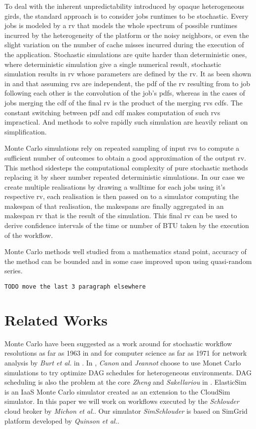 \documentclass[10pt,conference,compsocconf]{IEEEtran}
\begin{document}
To deal with the inherent unpredictability introduced by opaque heterogeneous
girds, the standard approach is to consider jobs runtimes to be stochastic.
Every jobs is modeled by a \ac{rv} that models the whole spectrum of possible
runtimes incurred by the heterogeneity of the platform or the noisy neighbors,
or even the slight variation on the number of cache misses incurred during the
execution of the application. Stochastic simulations are quite harder than
deterministic ones, where deterministic simulation give a single numerical
result, stochastic simulation results in \ac{rv} whose parameters are defined by
the \ac{rv}. It as been shown in \cite{Li97} and \cite{Ludwig01} that assuming
\acp{rv} are independent, the \ac{pdf} of the \ac{rv} resulting from to job
following each other is the convolution of the job's \acp{pdf}, whereas in the
cases of jobs merging the \ac{cdf} of the final \ac{rv} is the product of the
merging \acp{rv} \acp{cdf}.  The constant switching between \ac{pdf} and
\ac{cdf} makes computation of such \acp{rv} impractical. And methods to solve
rapidly such simulation are heavily reliant on simplification.

Monte Carlo simulations rely on repeated sampling of input \acp{rv} to compute a
sufficient number of outcomes to obtain a good approximation of the output
\ac{rv}. This method sidesteps the computational complexity of pure stochastic
methods replacing it by sheer number repeated deterministic simulations. In our
case we create multiple realisations by drawing a walltime for each jobs using
it's respective \ac{rv}, each realisation is then passed on to a simulator
computing the makespan of that realisation, the makespans are finally aggregated
in an makespan \ac{rv} that is the result of the simulation. This final \acl{rv}
can be used to derive confidence intervals of the time or number of BTU taken by
the execution of the workflow.

Monte Carlo methods well studied from a mathematics stand point, accuracy of the
method can be bounded and in some case improved upon using quasi-random series.

\texttt{TODO move the last 3 paragraph elsewhere}

\section{Related Works}

Monte Carlo have been suggested as a work around for stochastic workflow
resolutions as far as 1963 in \cite{beenhaker63} and for computer science as far
as 1971 for network analysis by \emph{Burt et al.} in \cite{burt71}. In
\cite{Canon10}, \emph{Canon} and \emph{Jeannot} choose to use Monet Carlo
simulations to try optimize DAG schedules for heterogeneous environments. {DAG}
scheduling is also the problem at the core \emph{Zheng} and \emph{Sakellariou}
in \cite{Zheng13}. ElasticSim\cite{cai16} is an \ac{IaaS} Monte Carlo simulator
created as an extension to the CloudSim\cite{cloudsim} simulator. In this paper
we will work on workflows executed by the \emph{Schlouder}\cite{Michon17} cloud
broker by \emph{Michon et al.}. Our simulator \emph{SimSchlouder}\cite{?}  is
based on SimGrid \cite{simgrid} platform developed by \emph{Quinson et al.}.
\end{document}

